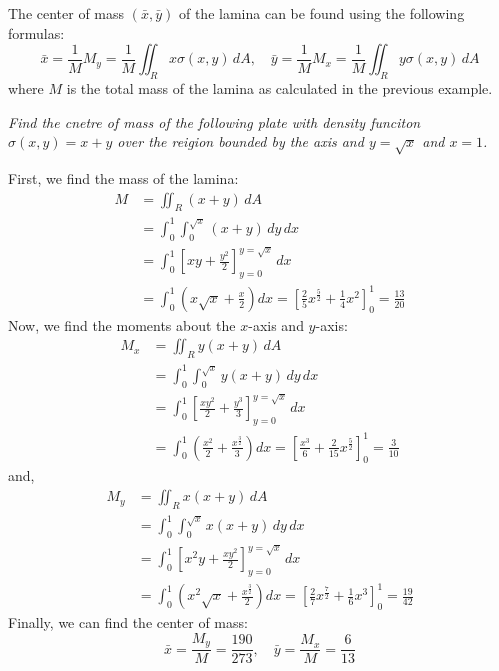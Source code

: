 \documentclass[11pt]{report}
\begin{document}
\begin{definition}
    The center of mass $(\bar{x}, \bar{y})$ of the lamina can be found using the following formulas:
    \begin{equation}
        \bar{x} = \frac{1}{M} M_y = \frac{1}{M} \iint_R x \sigma(x,y) \, dA, \quad \bar{y} = \frac{1}{M} M_x = \frac{1}{M} \iint_R y \sigma(x,y) \, dA
    \end{equation}
    where $M$ is the total mass of the lamina as calculated in the previous example.
\end{definition}

\begin{example}
    \textit{Find the cnetre of mass of the following plate with density funciton $\sigma(x,y) = x + y$ over the reigion bounded by the axis and $y = \sqrt{x}$ and $x = 1$.}

    First, we find the mass of the lamina:
    \begin{align*}
        M &= \iint_R (x + y) \, dA \\
        &= \int_0^1 \int_0^{\sqrt{x}} (x + y) \, dy \, dx \\
        &= \int_0^1 \left[ xy + \frac{y^2}{2} \right]_{y=0}^{y=\sqrt{x}} \, dx \\
        &= \int_0^1 \left( x\sqrt{x} + \frac{x}{2} \right) dx = \left[ \frac{2}{5} x^{\frac{5}{2}} + \frac{1}{4} x^2 \right]_{0}^{1} = \frac{13}{20}
    \end{align*}
    Now, we find the moments about the $x$-axis and $y$-axis:
    \begin{align*}
        M_x &= \iint_R y(x + y) \, dA \\
        &= \int_0^1 \int_0^{\sqrt{x}} y(x + y) \, dy \, dx \\
        &= \int_0^1 \left[ \frac{xy^2}{2} + \frac{y^3}{3} \right]_{y=0}^{y=\sqrt{x}} \, dx \\
        &= \int_0^1 \left( \frac{x^2}{2} + \frac{x^{\frac{3}{2}}}{3} \right) dx = \left[ \frac{x^3}{6} + \frac{2}{15} x^{\frac{5}{2}} \right]_{0}^{1} = \frac{3}{10}
    \end{align*}
    and,
    \begin{align*}
        M_y &= \iint_R x(x + y) \, dA \\
        &= \int_0^1 \int_0^{\sqrt{x}} x(x + y) \, dy \, dx \\
        &= \int_0^1 \left[ x^2y + \frac{xy^2}{2} \right]_{y=0}^{y=\sqrt{x}} \, dx \\
        &= \int_0^1 \left( x^2\sqrt{x} + \frac{x^{\frac{3}{2}}}{2} \right) dx = \left[ \frac{2}{7} x^{\frac{7}{2}} + \frac{1}{6} x^3 \right]_{0}^{1} = \frac{19}{42}
    \end{align*}
    Finally, we can find the center of mass:
    $$        
    \bar{x} = \frac{M_y}{M} = \frac{190}{273}, \quad \bar{y} = \frac{M_x}{M} = \frac{6}{13}
    $$
\end{example}
\end{document}
